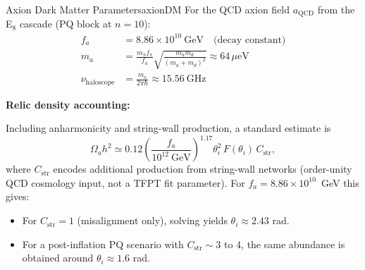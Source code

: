 \begin{theorem}{Axion Dark Matter Parameters}{axionDM}
For the QCD axion field $a_{\text{QCD}}$ from the E$_8$ cascade (PQ block at $n = 10$):
\begin{align}
    f_a &= 8.86 \times 10^{10}~\text{GeV} \quad \text{(decay constant)}\\
    m_a &= \frac{m_\pi f_\pi}{f_a}\sqrt{\frac{m_u m_d}{(m_u + m_d)^2}} \approx 64\,\mu\text{eV}\\
    \nu_{\text{haloscope}} &= \frac{m_a}{2\pi\hbar} \approx 15.56~\text{GHz}
\end{align}
\end{theorem}

\textbf{Relic density accounting:}

Including anharmonicity and string-wall production, a standard estimate is
\begin{equation}
    \Omega_a h^2 \simeq 0.12\left(\frac{f_a}{10^{12}~\text{GeV}}\right)^{1.17}\theta_i^2\,F(\theta_i)\,C_{\mathrm{str}},
\end{equation}
where $C_{\mathrm{str}}$ encodes additional production from string-wall networks (order-unity QCD cosmology input, not a TFPT fit parameter).
For $f_a = 8.86 \times 10^{10}$~GeV this gives:
\begin{itemize}[leftmargin=1.5em, topsep=2pt, itemsep=1pt]
    \item For $C_{\mathrm{str}}=1$ (misalignment only), solving yields $\theta_i \approx 2.43$ rad.
    \item For a post-inflation PQ scenario with $C_{\mathrm{str}}\sim 3$ to $4$, the same abundance is obtained around $\theta_i \approx 1.6$ rad.
\end{itemize}


